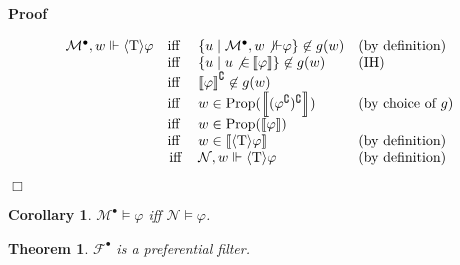 \documentclass{article}
\newcommand{\nin}{\not\in}
\newcommand{\tmmathbf}[1]{\ensuremath{\boldsymbol{#1}}}
\newcommand{\tmop}[1]{\ensuremath{\operatorname{#1}}}
\newcommand{\tmtextbf}[1]{\text{{\bfseries{#1}}}}
\newenvironment{proof}{\noindent\textbf{Proof\ }}{\hspace*{\fill}$\Box$\medskip}
\newtheorem{corollary}{Corollary}
\newtheorem{theorem}{Theorem}
\newcommand{\Model}{\ensuremath{\mathcal{M}}}
\newcommand{\Net}{\ensuremath{\mathcal{N}}}
\newcommand{\semantics}[1]{\left\llbracket #1 \right\rrbracket}
\newcommand{\diaTyp}{\langle \tmmathbf{\text{T}} \rangle}
\newcommand{\Prop}{\textsf{\tmop{Prop}}}
\begin{document}
\begin{proof}
\begin{description}
    \tmtextbf{$\diaTyp \varphi$ case:}
    \[ \begin{array}{lcll}
         \Model^{\bullet}, w \Vdash \diaTyp \varphi & \text{iff } & \left\{ u
         \mid \Model^{\bullet}, w \not{\Vdash} \varphi \right\} \nin g (w) &
         \text{(by definition)}\\
         & \text{iff } & \left\{ u \mid u \not{\in} \semantics{\varphi}
         \right\} \nin g (w) & \text{(IH)}\\
         & \text{iff } & \semantics{\varphi}^{\complement} \nin g (w) & \\
         & \text{iff } & w \in \Prop
         (\semantics{(\varphi^{\complement})^{\complement}}) & \text{(by
         choice of } g)\\
         & \text{iff } & w \in \Prop (\semantics{\varphi}) & \\
         & \text{iff } & w \in \semantics{\diaTyp \varphi} & \text{(by
         definition)}\\
         & \tmop{iff} & \Net, w \Vdash \diaTyp \varphi & \text{(by
         definition)}
       \end{array} \]
  \end{description}
  
\end{proof}

\begin{corollary}
  $\Model^{\bullet} \models \varphi$ iff $\Net \models \varphi$.
\end{corollary}

\begin{theorem}
  \label{simulation-is-preferential}$\mathcal{F}^{\bullet}$ is a preferential
  filter.
\end{theorem}
\end{document}

